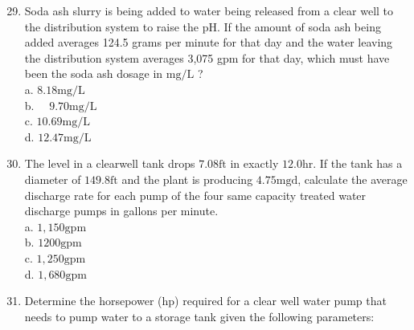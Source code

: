 \documentclass[10pt]{article}
\begin{document}
\begin{enumerate}
  \setcounter{enumi}{28}
  \item Soda ash slurry is being added to water being released from a clear well to the distribution system to raise the $\mathrm{pH}$. If the amount of soda ash being added averages 124.5 grams per minute for that day and the water leaving the distribution system averages 3,075 gpm for that day, which must have been the soda ash dosage in $\mathrm{mg} / \mathrm{L}$ ?\\
a. $8.18 \mathrm{mg} / \mathrm{L}$\\
b. $\quad 9.70 \mathrm{mg} / \mathrm{L}$\\
c. $10.69 \mathrm{mg} / \mathrm{L}$\\
d. $12.47 \mathrm{mg} / \mathrm{L}$

  \item The level in a clearwell tank drops $7.08 \mathrm{ft}$ in exactly $12.0 \mathrm{hr}$. If the tank has a diameter of $149.8 \mathrm{ft}$ and the plant is producing $4.75 \mathrm{mgd}$, calculate the average discharge rate for each pump of the four same capacity treated water discharge pumps in gallons per minute.\\
a. $1,150 \mathrm{gpm}$\\
b. $1200 \mathrm{gpm}$\\
c. $1,250 \mathrm{gpm}$\\
d. $1,680 \mathrm{gpm}$

  \item Determine the horsepower (hp) required for a clear well water pump that needs to pump water to a storage tank given the following parameters:

\end{enumerate}
\end{document}
